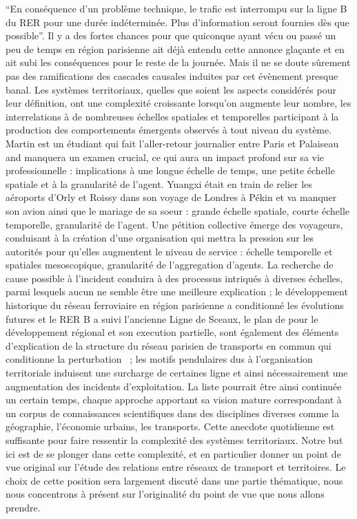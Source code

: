 {}{
``En conséquence d'un problème technique, le trafic est interrompu sur la ligne B du RER pour une durée indéterminée. Plus d'information seront fournies dès que possible''. Il y a des fortes chances pour que quiconque ayant vécu ou passé un peu de temps en région parisienne ait déjà entendu cette annonce glaçante et en ait subi les conséquences pour le reste de la journée. Mais il ne se doute sûrement pas des ramifications des cascades causales induites par cet évènement presque banal. Les systèmes territoriaux, quelles que soient les aspects considérés pour leur définition, ont une complexité croissante lorsqu'on augmente leur nombre, les interrelations à de nombreuses échelles spatiales et temporelles participant à la production des comportements émergents observés à tout niveau du système. Martin est un étudiant qui fait l'aller-retour journalier entre Paris et Palaiseau and manquera un examen crucial, ce qui aura un impact profond sur sa vie professionnelle : implications à une longue échelle de temps, une petite échelle spatiale et à la granularité de l'agent. Yuangxi était en train de relier les aéroports d'Orly et Roissy dans son voyage de Londres à Pékin et va manquer son avion ainsi que le mariage de sa soeur : grande échelle spatiale, courte échelle temporelle, granularité de l'agent. Une pétition collective émerge des voyageurs, conduisant à la création d'une organisation qui mettra la pression sur les autorités pour qu'elles augmentent le niveau de service : échelle temporelle et spatiales mesoscopique, granularité de l'aggregation d'agents. La recherche de cause possible à l'incident conduira à des processus intriqués à diverses échelles, parmi lesquels aucun ne semble être une meilleure explication ; le développement historique du réseau ferroviaire en région parisienne a conditionné les évolutions futures et le RER B a suivi l'ancienne Ligne de Sceaux, le plan de  pour le développement régional et son execution partielle, sont également des éléments d'explication de la structure du réseau parisien de transports en commun qui conditionne la perturbation~\cite{gleyze2005vulnerabilite} ; les motifs pendulaires dus à l'organisation territoriale induisent une surcharge de certaines ligne et ainsi nécessairement une augmentation des incidents d'exploitation. La liste pourrait être ainsi continuée un certain temps, chaque approche apportant sa vision mature correspondant à un corpus de connaissances scientifiques dans des disciplines diverses comme la géographie, l'économie urbains, les transports. Cette anecdote quotidienne est suffisante pour faire ressentir la complexité des systèmes territoriaux. Notre but ici est de se plonger dans cette complexité, et en particulier donner un point de vue original sur l'étude des relations entre réseaux de transport et territoires. Le choix de cette position sera largement discuté dans une partie thématique, nous nous concentrons à présent sur l'originalité du point de vue que nous allons prendre.
}





